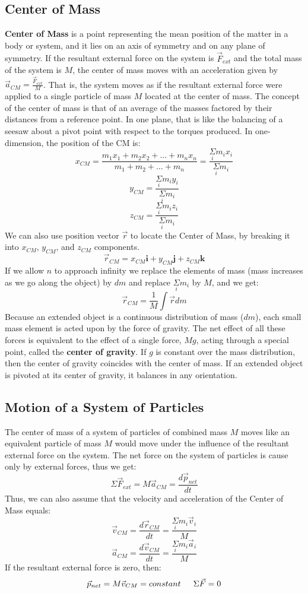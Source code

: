 \documentclass{article}
\begin{document}
\subsection{Center of Mass}
\textbf{Center of Mass} is a point representing the mean position of the matter in a body or system, and it lies on an axis of symmetry and on any plane of symmetry. If the resultant external force on the system is $\vec{F}_{ext}$ and the total mass of the system is $M$, the center of mass moves with an acceleration given by $\vec{a}_{CM}=\frac{\vec{F}_{ext}}{M}$. That is, the system moves as if the resultant external force were applied to a single particle of mass $M$ located at the center of mass. The concept of the center of mass is that of an average of the masses factored by their distances from a reference point. In one plane, that is like the balancing of a seesaw about a pivot point with respect to the torques produced. In one-dimension, the position of the CM is:
\[
x_{CM}=\frac{m_1x_1+m_2x_2+\ldots+m_nx_n}{m_1+m_2+\ldots+m_n}=\frac{\underset{i}{\Sigma}m_ix_i}{\underset{i}{\Sigma}m_i}
\]
\[
y_{CM}=\frac{\underset{i}{\Sigma}m_iy_i}{\underset{i}{\Sigma}m_i}
\]
\[
z_{CM}=\frac{\underset{i}{\Sigma}m_iz_i}{\underset{i}{\Sigma}m_i}
\]
We can also use position vector $\vec{r}$ to locate the Center of Mass, by breaking it into $x_{CM}$, $y_{CM}$, and $z_{CM}$ components.
\[
\vec{r}_{CM}=x_{CM}\textbf{i}+y_{CM}\textbf{j}+z_{CM}\textbf{k}
\]
If we allow $n$ to approach infinity we replace the elements of mass (mass increases as we go along the object) by $dm$ and replace $\underset{i}{\Sigma}m_i$ by $M$, and we get:
\[
\vec{r}_{CM}=\frac{1}{M}\int\vec{r}dm
\]
Because an extended object is a continuous distribution of mass ($dm$), each small mass element is acted upon by the force of gravity. The net effect of all these forces is equivalent to the effect of a single force, $Mg$, acting through a special point, called the \textbf{center of gravity}. If $g$ is constant over the mass distribution, then the center of gravity coincides with the center of mass. If an extended object is pivoted at its center of gravity, it balances in any orientation.

\subsection{Motion of a System of Particles}
The center of mass of a system of particles of combined mass $M$ moves like an equivalent particle of mass $M$ would move under the influence of the resultant external force on the system. The net force on the system of particles is cause only by external forces, thus we get:
\[
\Sigma\vec{F}_{ext}=M\vec{a}_{CM}=\frac{d\vec{p}_{net}}{dt}
\]
Thus, we can also assume that the velocity and acceleration of the Center of Mass equals:
\[
\vec{v}_{CM}=\frac{d\vec{r}_{CM}}{dt}=\frac{\underset{i}{\Sigma}m_i\vec{v}_i}{M}
\]
\[
\vec{a}_{CM}=\frac{d\vec{v}_{CM}}{dt}=\frac{\underset{i}{\Sigma}m_i\vec{a}_i}{M}
\]
If the resultant external force is zero, then:
\[
\vec{p}_{net}=M\vec{v}_{CM}=constant \indent
\Sigma\vec{F}=0
\]
\end{document}
